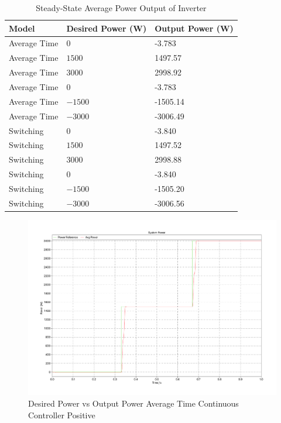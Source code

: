 \documentclass[12pt]{article}
\begin{document}
\begin{table}[ht]
    \caption{Steady-State Average Power Output of Inverter}
    \label{tab:c-transient}
    \centering{}
    \begin{tabular}{ l l l }
        \hline
        Model        & Desired Power (W) & Output Power (W) \\
        \hline
        Average Time & $0$               & -3.783           \\
        Average Time & $1500$            & 1497.57          \\
        Average Time & $3000$            & 2998.92          \\
        \hline
        Average Time & $0$               & -3.783           \\
        Average Time & $-1500$           & -1505.14         \\
        Average Time & $-3000$           & -3006.49         \\
        \hline
        Switching    & $0$               & -3.840           \\
        Switching    & $1500$            & 1497.52          \\
        Switching    & $3000$            & 2998.88          \\
        \hline
        Switching    & $0$               & -3.840           \\
        Switching    & $-1500$           & -1505.20         \\
        Switching    & $-3000$           & -3006.56         \\
        \hline
    \end{tabular}
\end{table}

\begin{figure}[ht]
    \centering{}
    \includegraphics[width=\textwidth, height=0.4\textheight, keepaspectratio]{img/Average Time C Power Positive.pdf}
    \caption{Desired Power vs Output Power Average Time Continuous Controller Positive}
    \label{fig:avg-time-c-power-positive}
\end{figure}
\end{document}
